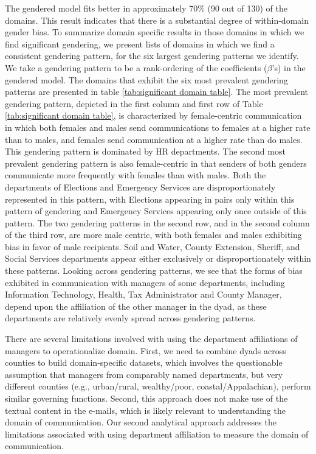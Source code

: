 \documentclass{pnastwo}
\begin{document}
\begin{article}
The gendered model fits better in approximately 70\% (90 out of 130) of the domains. This result indicates that there is a substantial degree of within-domain gender bias. To summarize domain specific results in those domains in which we find significant gendering, we present lists of domains in which we find a consistent gendering pattern, for the six largest gendering patterns we identify. We take a gendering pattern to be a rank-ordering of the coefficients ($\beta$'s) in the gendered model. The domains that exhibit the six most prevalent gendering patterns are presented in table \ref{tab:significant domain table}. The most prevalent gendering pattern, depicted in the first column and first row of Table \ref{tab:significant domain table}, is characterized by female-centric communication in which both females and males send communications to females at a higher rate than to males, and females send communication at a higher rate than do males. This gendering pattern is dominated by HR departments. The second most prevalent gendering pattern is also female-centric in that senders of both genders communicate more frequently with females than with males. Both the departments of Elections and Emergency Services are disproportionately represented in this pattern, with Elections appearing in pairs only within this pattern of gendering and Emergency Services appearing only once outside of this pattern. The two gendering patterns in the second row, and in the second column of the third row, are more male centric, with both females and males exhibiting bias in favor of male recipients. Soil and Water, County Extension, Sheriff, and Social Services departments appear either exclusively or disproportionately within these patterns. Looking across gendering patterns, we see that the forms of bias exhibited in communication with managers of some departments, including Information Technology, Health, Tax Administrator and County Manager, depend upon the affiliation of the other manager in the dyad, as these departments are relatively evenly spread across gendering patterns. 

There are several limitations involved with using the department affiliations of managers to operationalize domain. First, we need to combine dyads across counties to build domain-specific datasets, which involves the questionable assumption that managers from comparably named departments, but very different counties (e.g., urban/rural, wealthy/poor, coastal/Appalachian), perform similar governing functions. Second, this approach does not make use of the textual content in the e-mails, which is likely relevant to understanding the domain of communication. Our second analytical approach addresses the limitations associated with using department affiliation to measure the domain of communication.



\end{article}
\end{document}
